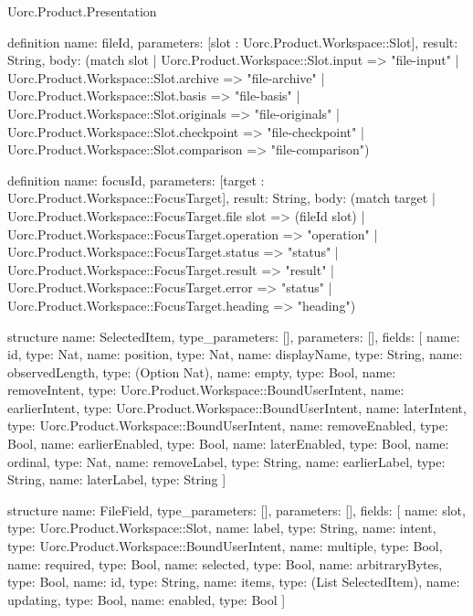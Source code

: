 \begin{lexlean}{Uorc.Product.Presentation}
\begin{semanticmodule}
definition{
  name: fileId,
  parameters: [slot : Uorc.Product.Workspace::Slot],
  result: String,
  body: (match slot
    | Uorc.Product.Workspace::Slot.input => "file-input"
    | Uorc.Product.Workspace::Slot.archive => "file-archive"
    | Uorc.Product.Workspace::Slot.basis => "file-basis"
    | Uorc.Product.Workspace::Slot.originals => "file-originals"
    | Uorc.Product.Workspace::Slot.checkpoint => "file-checkpoint"
    | Uorc.Product.Workspace::Slot.comparison => "file-comparison")
}

definition{
  name: focusId,
  parameters: [target : Uorc.Product.Workspace::FocusTarget],
  result: String,
  body: (match target
    | Uorc.Product.Workspace::FocusTarget.file slot => (fileId slot)
    | Uorc.Product.Workspace::FocusTarget.operation => "operation"
    | Uorc.Product.Workspace::FocusTarget.status => "status"
    | Uorc.Product.Workspace::FocusTarget.result => "result"
    | Uorc.Product.Workspace::FocusTarget.error => "status"
    | Uorc.Product.Workspace::FocusTarget.heading => "heading")
}

structure{
  name: SelectedItem,
  type_parameters: [],
  parameters: [],
  fields: [
    {name: id, type: Nat},
    {name: position, type: Nat},
    {name: displayName, type: String},
    {name: observedLength, type: (Option Nat)},
    {name: empty, type: Bool},
    {name: removeIntent, type: Uorc.Product.Workspace::BoundUserIntent},
    {name: earlierIntent, type: Uorc.Product.Workspace::BoundUserIntent},
    {name: laterIntent, type: Uorc.Product.Workspace::BoundUserIntent},
    {name: removeEnabled, type: Bool},
    {name: earlierEnabled, type: Bool},
    {name: laterEnabled, type: Bool},
    {name: ordinal, type: Nat},
    {name: removeLabel, type: String},
    {name: earlierLabel, type: String},
    {name: laterLabel, type: String}
  ]
}

structure{
  name: FileField,
  type_parameters: [],
  parameters: [],
  fields: [
    {name: slot, type: Uorc.Product.Workspace::Slot},
    {name: label, type: String},
    {name: intent, type: Uorc.Product.Workspace::BoundUserIntent},
    {name: multiple, type: Bool},
    {name: required, type: Bool},
    {name: selected, type: Bool},
    {name: arbitraryBytes, type: Bool},
    {name: id, type: String},
    {name: items, type: (List SelectedItem)},
    {name: updating, type: Bool},
    {name: enabled, type: Bool}
  ]
}


\end{semanticmodule}
\end{lexlean}
